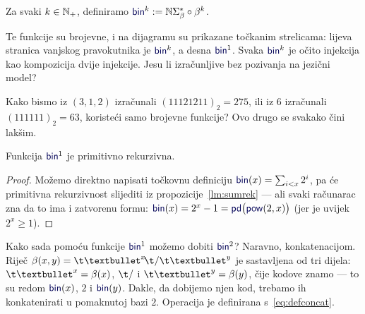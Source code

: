 \begin{definicija}\label{def:bink}
Za svaki $k\in{\mathbb N}_+$, definiramo $\f{bin}^k:=\N\Sigma_\beta^*\circ\beta^k$.
\end{definicija}

Te funkcije su brojevne, i na dijagramu su prikazane točkanim strelicama: lijeva stranica vanjskog pravokutnika je $\f{bin}^k$, a desna $\f{bin}^1$. Svaka $\f{bin}^k$ je očito injekcija kao kompozicija dvije injekcije. Jesu li izračunljive bez pozivanja na jezični model? %

Kako bismo iz $(3,1,2)$ izračunali $(11121211)_2=275$, ili iz $6$ izračunali $(111111)_2=63$, koristeći samo brojevne funkcije? Ovo drugo se svakako čini lakšim.

\begin{lema}\label{lm:bin1prn}
Funkcija $\f{bin}^1$\! je primitivno rekurzivna.
\end{lema}
\begin{proof}
Možemo direktno napisati točkovnu definiciju $\f{bin}(x)=\sum_{i<x}2^i$, pa će primitivna rekurzivnost slijediti iz propozicije~\ref{lm:sumrek} --- ali svaki računarac zna da to ima i zatvorenu formu:
$\f{bin}(x)=2^x-1=\f{pd}\bigl(\f{pow}(2,x)\bigr)$ (jer je uvijek $2^x\ge 1$).
\end{proof}

Kako sada pomoću funkcije $\f{bin}^1$ možemo dobiti $\f{bin}^2$? Naravno, konkatenacijom. Riječ $\beta(x,y)=\t\textbullet^x\!\t/\t\textbullet^y$ je sastavljena od tri dijela: $\t\textbullet^x=\beta(x)$, $\t/$ i $\t\textbullet^y=\beta(y)$, čije kodove znamo --- to su redom $\f{bin}(x)$, $2$ i $\f{bin}(y)$. Dakle, da dobijemo njen kod, trebamo ih konkatenirati u pomaknutoj bazi $2$. Operacija je definirana s~\eqref{eq:defconcat}.

